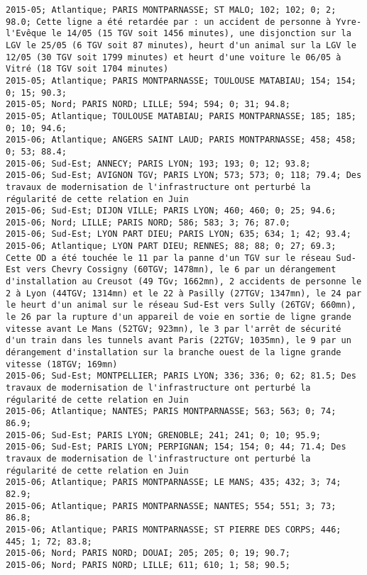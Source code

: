 \documentclass{article}
\begin{document}
\begin{Verbatim}[commandchars=\\\{\}]
2015-05; Atlantique; PARIS MONTPARNASSE; ST MALO; 102; 102; 0; 2; 98.0; Cette ligne a été retardée par : un accident de personne à Yvre-l'Evêque le 14/05 (15 TGV soit 1456 minutes), une disjonction sur la LGV le 25/05 (6 TGV soit 87 minutes), heurt d'un animal sur la LGV le 12/05 (30 TGV soit 1799 minutes) et heurt d'une voiture le 06/05 à Vitré (18 TGV soit 1704 minutes)
2015-05; Atlantique; PARIS MONTPARNASSE; TOULOUSE MATABIAU; 154; 154; 0; 15; 90.3; 
2015-05; Nord; PARIS NORD; LILLE; 594; 594; 0; 31; 94.8; 
2015-05; Atlantique; TOULOUSE MATABIAU; PARIS MONTPARNASSE; 185; 185; 0; 10; 94.6; 
2015-06; Atlantique; ANGERS SAINT LAUD; PARIS MONTPARNASSE; 458; 458; 0; 53; 88.4; 
2015-06; Sud-Est; ANNECY; PARIS LYON; 193; 193; 0; 12; 93.8; 
2015-06; Sud-Est; AVIGNON TGV; PARIS LYON; 573; 573; 0; 118; 79.4; Des travaux de modernisation de l'infrastructure ont perturbé la régularité de cette relation en Juin
2015-06; Sud-Est; DIJON VILLE; PARIS LYON; 460; 460; 0; 25; 94.6; 
2015-06; Nord; LILLE; PARIS NORD; 586; 583; 3; 76; 87.0; 
2015-06; Sud-Est; LYON PART DIEU; PARIS LYON; 635; 634; 1; 42; 93.4; 
2015-06; Atlantique; LYON PART DIEU; RENNES; 88; 88; 0; 27; 69.3; Cette OD a été touchée le 11 par la panne d'un TGV sur le réseau Sud-Est vers Chevry Cossigny (60TGV; 1478mn), le 6 par un dérangement d'installation au Creusot (49 TGv; 1662mn), 2 accidents de personne le 2 à Lyon (44TGV; 1314mn) et le 22 à Pasilly (27TGV; 1347mn), le 24 par le heurt d'un animal sur le réseau Sud-Est vers Sully (26TGV; 660mn), le 26 par la rupture d'un appareil de voie en sortie de ligne grande vitesse avant Le Mans (52TGV; 923mn), le 3 par l'arrêt de sécurité d'un train dans les tunnels avant Paris (22TGV; 1035mn), le 9 par un dérangement d'installation sur la branche ouest de la ligne grande vitesse (18TGV; 169mn)
2015-06; Sud-Est; MONTPELLIER; PARIS LYON; 336; 336; 0; 62; 81.5; Des travaux de modernisation de l'infrastructure ont perturbé la régularité de cette relation en Juin
2015-06; Atlantique; NANTES; PARIS MONTPARNASSE; 563; 563; 0; 74; 86.9; 
2015-06; Sud-Est; PARIS LYON; GRENOBLE; 241; 241; 0; 10; 95.9; 
2015-06; Sud-Est; PARIS LYON; PERPIGNAN; 154; 154; 0; 44; 71.4; Des travaux de modernisation de l'infrastructure ont perturbé la régularité de cette relation en Juin
2015-06; Atlantique; PARIS MONTPARNASSE; LE MANS; 435; 432; 3; 74; 82.9; 
2015-06; Atlantique; PARIS MONTPARNASSE; NANTES; 554; 551; 3; 73; 86.8; 
2015-06; Atlantique; PARIS MONTPARNASSE; ST PIERRE DES CORPS; 446; 445; 1; 72; 83.8; 
2015-06; Nord; PARIS NORD; DOUAI; 205; 205; 0; 19; 90.7; 
2015-06; Nord; PARIS NORD; LILLE; 611; 610; 1; 58; 90.5; 

\end{Verbatim}
\end{document}
